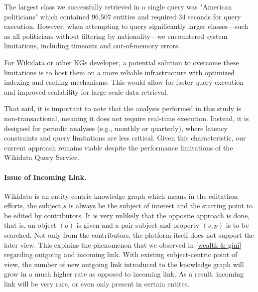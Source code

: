 The largest class we successfully retrieved in a single query was "American politicians" which contained 96,507 entities and required 34 seconds for query execution. However, when attempting to query significantly larger classes—such as all politicians without filtering by nationality—we encountered system limitations, including timeouts and out-of-memory errors.

For Wikidata or other KGs developer, a potential solution to overcome these limitations is to host them on a more reliable infrastructure with optimized indexing and caching mechanisms. This would allow for faster query execution and improved scalability for large-scale data retrieval.

That said, it is important to note that the analysis performed in this study is non-transactional, meaning it does not require real-time execution. Instead, it is designed for periodic analyses (e.g., monthly or quarterly), where latency constraints and query limitations are less critical. Given this characteristic, our current approach remains viable despite the performance limitations of the Wikidata Query Service.


\paragraph{Issue of Incoming Link.}
Wikidata is an entity-centric knowledge graph which means in the editathon efforts, the subject \(s\) is always be the subject of interest and the starting point to be edited by contributors. It is very unlikely that the opposite approach is done, that is, an object \((o)\) is given and a pair subject and property \((s, p)\) is to be searched. Not only from the contributors, the platform itself does not support the later view. This explains the phenomenon that we observed in \autoref{wealth & gini} regarding outgoing and incoming link. With existing subject-centric point of view, the number of new outgoing link introduced to the knowledge graph will grow in a much higher rate as opposed to incoming link. As a result, incoming link will be very rare, or even only present in certain entites.

